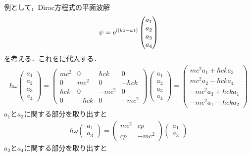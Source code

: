 \documentclass{report}
\begin{document}
例として，Dirac方程式の平面波解
\begin{align}
  \psi = \mathrm{e}^{\mathrm{i}(kz - \omega t)}
  \begin{pmatrix}
    a_1\\a_2\\a_3\\a_4
  \end{pmatrix}
\end{align}
を考える．これをに代入する．
\begin{align}
  \label{plane-wave-in-dirac}
  \hbar\omega
  \begin{pmatrix}
    a_1\\ a_2\\ a_3\\ a_4
  \end{pmatrix}
  =
  \begin{pmatrix}
    mc^2 & 0 & \hbar ck & 0\\
    0 & mc^2 & 0 & -\hbar ck \\
    \hbar ck & 0 & -mc^2 & 0\\
    0 & -\hbar ck & 0 & -mc^2
  \end{pmatrix}
  \begin{pmatrix}
    a_1\\a_2\\a_3\\a_4
  \end{pmatrix}
  =
  \begin{pmatrix}
    mc^2 a_1 + \hbar c k a_3\\
    mc^2 a_2 - \hbar c k a_4\\
    -mc^2 a_3 + \hbar c k a_1\\
    -mc^2 a_1 - \hbar c k a_2
  \end{pmatrix}
\end{align}
$a_1$と$a_3$に関する部分を取り出すと
\begin{align}
  \label{up-spin}
  \hbar \omega
  \begin{pmatrix}
    a_1\\a_3
  \end{pmatrix}
    =
    \begin{pmatrix}
      mc^2 & cp\\
      cp & -mc^2
    \end{pmatrix}
    \begin{pmatrix}
      a_1\\a_3
    \end{pmatrix}
\end{align}
$a_2$と$a_4$に関する部分を取り出すと
\end{document}
